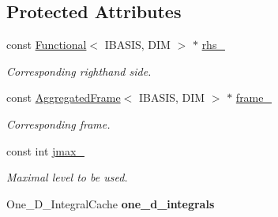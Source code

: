\subsection*{Protected Attributes}
\begin{CompactItemize}
\item 
\hypertarget{classFrameTL_1_1SimpleBiharmonicEquation_605145fcb9d6800e6f72a9b75f5dfc00}{
const \hyperlink{classFrameTL_1_1Functional}{Functional}$<$ IBASIS, DIM $>$ $\ast$ \hyperlink{classFrameTL_1_1SimpleBiharmonicEquation_605145fcb9d6800e6f72a9b75f5dfc00}{rhs\_\-}}
\label{classFrameTL_1_1SimpleBiharmonicEquation_605145fcb9d6800e6f72a9b75f5dfc00}

\begin{CompactList}\small\item\em Corresponding righthand side. \item\end{CompactList}\item 
\hypertarget{classFrameTL_1_1SimpleBiharmonicEquation_ee4484b0c857d66111e2453923f44cf6}{
const \hyperlink{classFrameTL_1_1AggregatedFrame}{AggregatedFrame}$<$ IBASIS, DIM $>$ $\ast$ \hyperlink{classFrameTL_1_1SimpleBiharmonicEquation_ee4484b0c857d66111e2453923f44cf6}{frame\_\-}}
\label{classFrameTL_1_1SimpleBiharmonicEquation_ee4484b0c857d66111e2453923f44cf6}

\begin{CompactList}\small\item\em Corresponding frame. \item\end{CompactList}\item 
\hypertarget{classFrameTL_1_1SimpleBiharmonicEquation_687ebf034df016d1d1ac67cf6cfc72ac}{
const int \hyperlink{classFrameTL_1_1SimpleBiharmonicEquation_687ebf034df016d1d1ac67cf6cfc72ac}{jmax\_\-}}
\label{classFrameTL_1_1SimpleBiharmonicEquation_687ebf034df016d1d1ac67cf6cfc72ac}

\begin{CompactList}\small\item\em Maximal level to be used. \item\end{CompactList}\item 
\hypertarget{classFrameTL_1_1SimpleBiharmonicEquation_0a9667f71ee07926f08e396684ed61a7}{
One\_\-D\_\-IntegralCache \textbf{one\_\-d\_\-integrals}}
\label{classFrameTL_1_1SimpleBiharmonicEquation_0a9667f71ee07926f08e396684ed61a7}

\end{CompactItemize}


